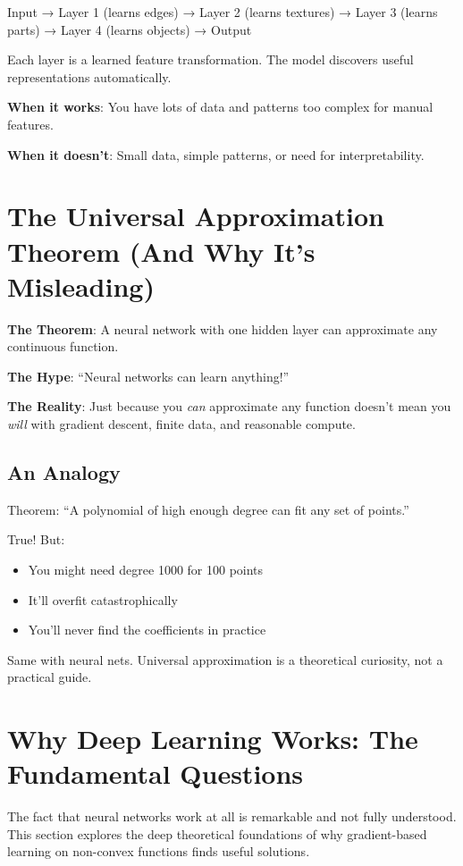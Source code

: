 Input → Layer 1 (learns edges) → Layer 2 (learns textures) → Layer 3 (learns parts) → Layer 4 (learns objects) → Output

Each layer is a learned feature transformation. The model discovers useful representations automatically.

\textbf{When it works}: You have lots of data and patterns too complex for manual features.

\textbf{When it doesn't}: Small data, simple patterns, or need for interpretability.

\section{The Universal Approximation Theorem (And Why It's Misleading)}

\textbf{The Theorem}: A neural network with one hidden layer can approximate any continuous function.

\textbf{The Hype}: ``Neural networks can learn anything!''

\textbf{The Reality}: Just because you \textit{can} approximate any function doesn't mean you \textit{will} with gradient descent, finite data, and reasonable compute.

\subsection{An Analogy}

Theorem: ``A polynomial of high enough degree can fit any set of points.''

True! But:
\begin{itemize}
\item You might need degree 1000 for 100 points
\item It'll overfit catastrophically
\item You'll never find the coefficients in practice
\end{itemize}

Same with neural nets. Universal approximation is a theoretical curiosity, not a practical guide.

\section{Why Deep Learning Works: The Fundamental Questions}

The fact that neural networks work at all is remarkable and not fully understood. This section explores the deep theoretical foundations of why gradient-based learning on non-convex functions finds useful solutions.

